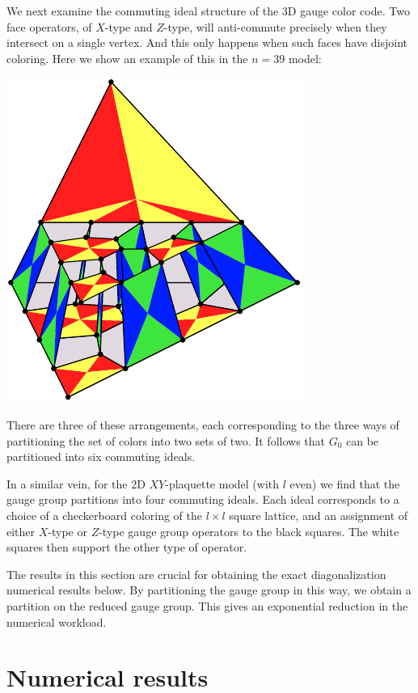 \documentclass[11pt,oneside]{article}
\begin{document}
We next examine the commuting ideal structure of the 3D gauge color code.
Two face operators, of $X$-type and $Z$-type,
will anti-commute precisely when they intersect on a single vertex.
And this only happens when such faces have disjoint coloring.
Here we show an example of this in the $n=39$ model:
\begin{center}
\includegraphics[width=0.3\columnwidth]{pic-gcolor-ideal.pdf}
\end{center}
There are three of these arrangements,
each corresponding to the three ways of
partitioning the set of colors into two sets of two.
It follows that $G_0$
can be partitioned into six commuting ideals.

In a similar vein,
for the 2D $XY$-plaquette model (with $l$ even)
we find that the gauge group partitions
into four commuting ideals.
Each ideal corresponds to a choice of 
a checkerboard coloring of the $l\times l$ square lattice,
and an assignment of either $X$-type or $Z$-type
gauge group operators to the black squares.
The white squares then support the other type of operator.

The results in this section are crucial for obtaining the exact
diagonalization numerical results below.
By partitioning the gauge group in this way, 
we obtain a partition on the reduced gauge group. 
This gives an exponential reduction
in the numerical workload.


%



\section{Numerical results}\label{Sec6}
\end{document}
